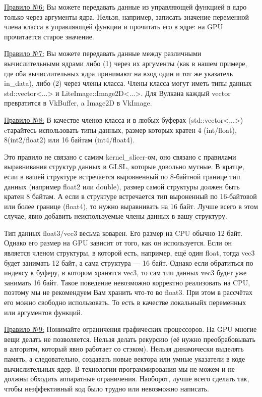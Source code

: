 \documentclass[11pt,fleqn,english,russian]{report} %
\begin{document}
\underline{Правило №6:} Вы можете передавать данные из управляющей функцией в ядро только через аргументы ядра. Нельзя, например, записать значение переменной члена класса в управляющей функции и прочитать его в ядре: на GPU прочитается старое значение.

\underline{Правило №7:} Вы можете передавать данные между различными вычислительными ядрами либо (1) через их аргументы (как в нашем примере, где оба вычислительных ядра принимают на вход один и тот же указатель in\_data), либо (2) через члены класса. Члены класса могут иметь типы данных std::vector<...> и LiteImage::Image2D<...>. Для Вулкана каждый vector превратится в VkBuffer, a Image2D в VkImage.

\underline{Правило №8:} В качестве членов класса и в любых буферах (std::vector<...>) cтарайтесь использовать типы данных, размер которых кратен 4 (int/float), 8(int2/float2) или 16 байтам (int4/float4). 

\begin{remark}
Это правило не связано с самим kernel\_slicer-ом, оно связано с правилами выравнивания структур данных в GLSL, которые довольно мутные. В кратце, если в вашей структуре встречается выровненный по 8-байтной границе тип данных (например float2 или double), размер самой структуры должен быть кратен 8 байтам. А если в структуре встречается тип выроненный по 16-байтовой или более границе (float4), то нужно выравнивать на 16 байт. Лучше всего в этом случае, явно добавить неиспользуемые члены данных в вашу структуру.
\end{remark}

\begin{remark}
Тип данных float3/vec3 весьма коварен. Его размер на CPU обычно 12 байт. Однако его размер на GPU зависит от того, как он используется. Если он является членом структуры, в которой есть, например, ещё один float, тогда vec3 будет занимать 12 байт, а сама структура --- 16 байт. Однако если обратиться по индексу к буферу, в котором хранятся vec3, то сам тип данных vec3 будет уже занимать 16 байт. Такое поведение невозможно корректно реализовать на CPU, поэтому мы не рекомендуем Вам хранить что-то во float3. При этом в рассчётах его можно свободно использовать. То есть в качестве локальныйх переменных или аргументов функций.
\end{remark}	

\underline{Правило №9:} Понимайте ограничения графических процессоров. На GPU многие вещи делать не позволяется. Нельзя делать рекурсию (её нужно преобрабовывать в алгоритм, который явно работает со стэком). Нельзя динамически выделять память, а следовательно, создавать новые вектора или умные указатели в коде вычислительных ядер. В технологии программирования мы не можем и не должны обходить аппаратные ограничения. Наоборот, лучше всего сделать так, чтобы неэффективный код было трудно или невозможно написать.
\end{document}
